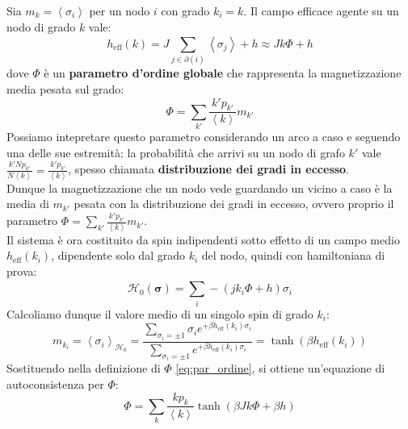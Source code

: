 Sia $m_k=\left\langle \sigma_i\right\rangle $ per un nodo $i$ con grado $k_i=k$. Il campo efficace agente su un nodo di grado $k$ vale:
\begin{equation} 
    h_{\text{eff}}(k)=J\sum_{j \in \partial(i)}^{}\left\langle \sigma_j\right\rangle +h \approx Jk \Phi + h
\end{equation}
dove $\Phi$ è un \textbf{parametro d'ordine globale} che rappresenta la magnetizzazione media pesata sul grado:
\begin{equation}
    \Phi=\sum_{k'}^{}\frac{k'p_{k'}}{\left\langle k\right\rangle }m_{k'}
    \label{eq:par_ordine}
\end{equation}
Possiamo intepretare questo parametro considerando un arco a caso e seguendo una delle sue estremità: la probabilità che arrivi su un nodo di grafo $k'$ vale $\frac{k' N p_{k'}}{N \left\langle k\right\rangle }=\frac{k' p_{k'}}{\left\langle k\right\rangle}$, spesso chiamata \textbf{distribuzione dei gradi in eccesso}.\\
Dunque la magnetizzazione che un nodo vede guardando un vicino a caso è la media di $m_{k'}$ pesata con la distribuzione dei gradi in eccesso, ovvero proprio il parametro $\Phi=\sum_{k'}^{}\frac{k' p_{k'}}{\left\langle k\right\rangle}m_{k'}$.\\

Il sistema è ora costituito da spin indipendenti sotto effetto di un campo medio $h_{\text{eff}}(k_i)$, dipendente solo dal grado $k_i$ del nodo, quindi con hamiltoniana di prova:
\begin{equation}
\mathcal{H}_0(\mathbf{\sigma})=\sum_{i}^{}-(jk_i\Phi+h)\sigma_i  
\end{equation}
Calcoliamo dunque il valore medio di un singolo spin di grado $k_i$:
\begin{equation}
    m_{k_i}=\left\langle \sigma_i\right\rangle_{\mathcal{H}_0}=\frac{\sum_{\sigma_i=\pm 1 }^{}\sigma_i e^{+\beta h_{\text{eff}}(k_i)\sigma_i}}{\sum_{\sigma_i=\pm 1 }^{}e^{+\beta h_{\text{eff}}(k_i)\sigma_i}} = \tanh(\beta h_{\text{eff}}(k_i))
\end{equation}
Sostituendo nella definizione di $\Phi$ \eqref{eq:par_ordine}, si ottiene un'equazione di autoconsistenza per $\Phi$:
\begin{equation}
    \Phi=\sum_{k}^{}\frac{kp_k}{\left\langle k\right\rangle }\tanh(\beta Jk \Phi + \beta h)
\end{equation}


